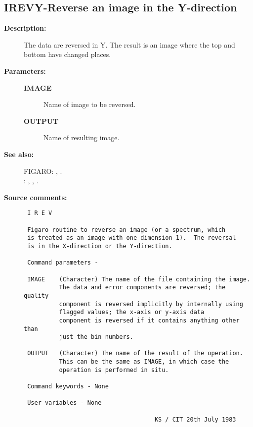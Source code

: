 \subsection{IREVY-\label{IREVY}Reverse an image in the Y-direction}
\begin{description}

\item [{\bf Description:}]
 The data are reversed in Y.  The result is an image where
 the top and bottom have changed places.

\item [{\bf Parameters:}]
\begin{description}
\item [{\bf IMAGE}]
 Name of image to be reversed.
\item [{\bf OUTPUT}]
 Name of resulting image.
\end{description}

\item [{\bf See also:}]
FIGARO: , .\\
: , , .\\

\item [{\bf Source comments:}]
\begin{verbatim}
 I R E V

 Figaro routine to reverse an image (or a spectrum, which
 is treated as an image with one dimension 1).  The reversal
 is in the X-direction or the Y-direction.

 Command parameters -

 IMAGE    (Character) The name of the file containing the image.
          The data and error components are reversed; the quality
          component is reversed implicitly by internally using
          flagged values; the x-axis or y-axis data
          component is reversed if it contains anything other than
          just the bin numbers.

 OUTPUT   (Character) The name of the result of the operation.
          This can be the same as IMAGE, in which case the
          operation is performed in situ.

 Command keywords - None

 User variables - None

                                     KS / CIT 20th July 1983
\end{verbatim}
\end{description}
